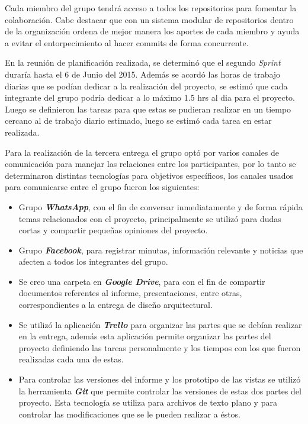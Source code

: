 \documentclass{memoria}
\begin{document}
Cada miembro del grupo tendrá acceso a todos los repositorios para fomentar la colaboración. Cabe destacar que con un sistema modular de repositorios dentro de la organización ordena de mejor manera los aportes de cada miembro y ayuda a evitar el entorpecimiento al hacer commits de forma concurrente.

\newpage


En la reunión de planificación realizada, se determinó que el segundo \textsl{Sprint} duraría hasta el 6 de Junio del 2015. Además se acordó las horas de trabajo diarias que se podían dedicar a la realización del proyecto, se estimó que cada integrante del grupo podría dedicar a lo máximo 1.5 hrs al dia para el proyecto. Luego se definieron las tareas para que estas se pudieran realizar en un tiempo cercano al de trabajo diario estimado, luego se estimó cada tarea en estar realizada.

Para la realización de la tercera entrega el grupo optó por varios canales de comunicación para manejar las relaciones entre los participantes, por lo tanto se determinaron distintas tecnologías para objetivos específicos, los canales usados para comunicarse entre el grupo fueron los siguientes:

\begin{itemize}
	\item Grupo \textbf{\textsl{WhatsApp}}, con el fin de conversar inmediatamente y de forma rápida temas relacionados con el proyecto, principalmente se utilizó para dudas cortas y compartir pequeñas opiniones del proyecto.
	\item Grupo \textbf{\textsl{Facebook}}, para registrar minutas, información relevante y noticias que afecten a todos los integrantes del grupo.
	\item Se creo una carpeta en \textbf{\textsl{Google Drive}}, para con el fin de compartir documentos referentes al informe, presentaciones, entre otras, correspondientes a la entrega de diseño arquitectural.  
	\item Se utilizó la aplicación \textbf{\textsl{Trello}} para organizar las partes que se debían realizar en la entrega, además esta aplicación permite organizar las partes del proyecto definiendo las tareas personalmente y los tiempos con los que fueron realizadas cada una de estas.
	\item Para controlar las versiones del informe y los prototipo de las vistas se utilizó la herramienta \textbf{\textsl{Git}} que permite controlar las versiones de estas dos partes del proyecto. Esta tecnología se utiliza para archivos de texto plano y para controlar las modificaciones que se le pueden realizar a éstos.
\end{itemize}
\end{document}
